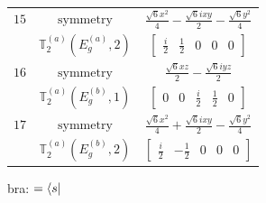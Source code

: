 \documentclass[fleqn,8pt,landscape]{jsarticle}
\begin{document}
\begin{longtable}{ccc}
$ 15 $ & $ \text{symmetry} $ & $ \frac{\sqrt{6} x^{2}}{4} - \frac{\sqrt{6} i x y}{2} - \frac{\sqrt{6} y^{2}}{4} $ \\
$  $ & $ \mathbb{T}_{2}^{(a)}(E_{g}^{(a)},2) $ & $ \begin{bmatrix} \frac{i}{2} & \frac{1}{2} & 0 & 0 & 0 \end{bmatrix} $ \\ \hline
$ 16 $ & $ \text{symmetry} $ & $ \frac{\sqrt{6} x z}{2} - \frac{\sqrt{6} i y z}{2} $ \\
$  $ & $ \mathbb{T}_{2}^{(a)}(E_{g}^{(b)},1) $ & $ \begin{bmatrix} 0 & 0 & \frac{i}{2} & \frac{1}{2} & 0 \end{bmatrix} $ \\ \hline
$ 17 $ & $ \text{symmetry} $ & $ \frac{\sqrt{6} x^{2}}{4} + \frac{\sqrt{6} i x y}{2} - \frac{\sqrt{6} y^{2}}{4} $ \\
$  $ & $ \mathbb{T}_{2}^{(a)}(E_{g}^{(b)},2) $ & $ \begin{bmatrix} \frac{i}{2} & - \frac{1}{2} & 0 & 0 & 0 \end{bmatrix} $ \\ \hline
\end{longtable}
bra: $=\bra{s}$
\end{document}
